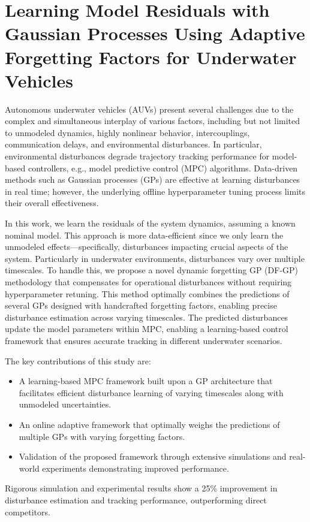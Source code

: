 \chapter{Learning Model Residuals with Gaussian Processes Using Adaptive Forgetting Factors for Underwater Vehicles}

Autonomous underwater vehicles (AUVs) present several challenges due to the complex and simultaneous interplay of various factors, including but not limited to unmodeled dynamics, highly nonlinear behavior, intercouplings, communication delays, and environmental disturbances. In particular, environmental disturbances degrade trajectory tracking performance for model-based controllers, e.g., model predictive control (MPC) algorithms. Data-driven methods such as Gaussian processes (GPs) are effective at learning disturbances in real time; however, the underlying offline hyperparameter tuning process limits their overall effectiveness.

In this work, we learn the residuals of the system dynamics, assuming a known nominal model. This approach is more data-efficient since we only learn the unmodeled effects—specifically, disturbances impacting crucial aspects of the system. Particularly in underwater environments, disturbances vary over multiple timescales. To handle this, we propose a novel dynamic forgetting GP (DF-GP) methodology that compensates for operational disturbances without requiring hyperparameter retuning. This method optimally combines the predictions of several GPs designed with handcrafted forgetting factors, enabling precise disturbance estimation across varying timescales. The predicted disturbances update the model parameters within MPC, enabling a learning-based control framework that ensures accurate tracking in different underwater scenarios.

The key contributions of this study are:

\begin{itemize}
\item A learning-based MPC framework built upon a GP architecture that facilitates efficient disturbance learning of varying timescales along with unmodeled uncertainties.
\item An online adaptive framework that optimally weighs the predictions of multiple GPs with varying forgetting factors.
\item Validation of the proposed framework through extensive simulations and real-world experiments demonstrating improved performance.
\end{itemize}

Rigorous simulation and experimental results show a 25\% improvement in disturbance estimation and tracking performance, outperforming direct competitors.
